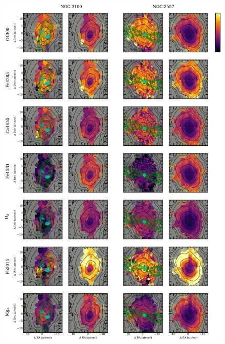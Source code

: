 {{\begin{figure}
			\includegraphics[height=0.94\textheight]{chapter4/vimos/abs4.png}
		\end{figure}
		\begin{figure}
			\centering

\end{figure}}}
